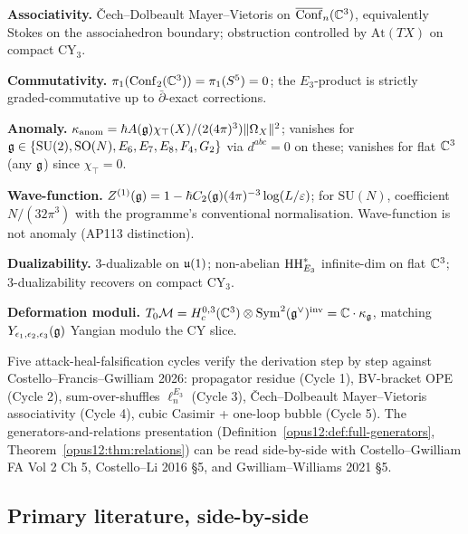 \textbf{Associativity.} Čech--Dolbeault Mayer--Vietoris on
$\overline{\mathrm{Conf}}_n(\mathbb{C}^3)$, equivalently Stokes on the
associahedron boundary; obstruction controlled by
$\mathrm{At}(TX)$ on compact CY$_3$.

\textbf{Commutativity.} $\pi_1(\mathrm{Conf}_2(\mathbb{C}^3)) = \pi_1(S^5) = 0$; the
$E_3$-product is strictly graded-commutative up to
$\bar\partial$-exact corrections.

\textbf{Anomaly.} $\kappa_{\mathrm{anom}} = \hbar A(\mathfrak{g})
\chi_\top(X)/(2(4\pi)^3) \|\Omega_X\|^2$; vanishes for
$\mathfrak{g} \in \{\mathrm{SU}(2), \mathrm{SO}(N), E_6, E_7, E_8, F_4, G_2\}$
via $d^{abc} = 0$ on these; vanishes for flat $\mathbb{C}^3$ (any $\mathfrak{g}$)
since $\chi_\top = 0$.

\textbf{Wave-function.} $Z^{(1)}(\mathfrak{g}) = 1 - \hbar C_2(\mathfrak{g})
(4\pi)^{-3} \log(L/\varepsilon)$; for $\mathrm{SU}(N)$, coefficient
$N/(32\pi^3)$ with the programme's conventional normalisation.
Wave-function is not anomaly (AP113 distinction).

\textbf{Dualizability.} 3-dualizable on $\mathfrak{u}(1)$; non-abelian
$\mathrm{HH}^*_{E_3}$ infinite-dim on flat $\mathbb{C}^3$; 3-dualizability
recovers on compact CY$_3$.

\textbf{Deformation moduli.} $T_0 \mathcal M = H^{0,3}_c(\mathbb{C}^3)
\otimes \mathrm{Sym}^2(\mathfrak{g}^\vee)^{\mathrm{inv}} = \mathbb{C} \cdot
\kappa_{\mathfrak{g}}$, matching $Y_{\epsilon_1, \epsilon_2, \epsilon_3}(\mathfrak{g})$
Yangian modulo the CY slice.

Five attack-heal-falsification cycles verify the derivation step by
step against Costello--Francis--Gwilliam 2026: propagator residue
(Cycle 1), BV-bracket OPE (Cycle 2), sum-over-shuffles
$\ell_n^{E_3}$ (Cycle 3), Čech--Dolbeault Mayer--Vietoris
associativity (Cycle 4), cubic Casimir + one-loop bubble (Cycle 5).
The generators-and-relations presentation
(Definition~\ref{opus12:def:full-generators},
Theorem~\ref{opus12:thm:relations}) can be read side-by-side with
Costello--Gwilliam FA Vol 2 Ch 5, Costello--Li 2016 §5, and
Gwilliam--Williams 2021 §5.

\subsection*{Primary literature, side-by-side}

